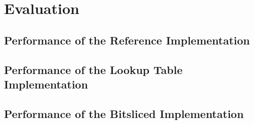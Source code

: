 \section{Evaluation}
\subsection{Performance of the Reference Implementation}
\subsection{Performance of the Lookup Table Implementation}
\subsection{Performance of the Bitsliced Implementation}